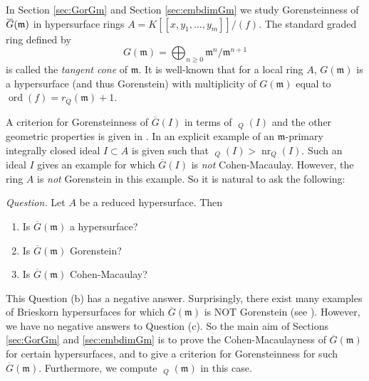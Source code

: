 \documentclass[12pt]{amsart}
\theoremstyle{definition}
\theoremstyle{remark}
\numberwithin{equation}{section}
\newcommand{\m}{{\mathfrak m}}
\DeclareMathOperator{\nr}{{nr}}
\DeclareMathOperator{\br}{\bar r}
\DeclareMathOperator{\ord}{ord}
\newcommand{\ol}[1]{\mkern 1.5mu\overline{\mkern-1.5mu#1\mkern-1.5mu}\mkern 1.5mu} %
\begin{document}
\par 
In Section \ref{sec:GorGm} and Section \ref{sec:embdimGm} 
we study Gorensteinness of $\ol{G}(\m)$ in hypersurface rings 
$A=K[\![x,y_1,\ldots,y_m]\!]/(f)$.
The standard graded ring defined by
\[
G(\m)=\bigoplus_{n \ge 0} \m^{n}/\m^{n+1}
\]
is called the \textit{tangent cone} of $\m$.
It is well-known that for a local ring $A$,
$G(\m)$ is a hypersurface (and thus Gorenstein) with 
multiplicity of $G(\m)$ equal to $\ord(f)=r_Q(\m)+1$.
\par 
A criterion for Gorensteinness of $\overline{G}(I)$ in terms of 
$\br_Q(I)$ and the other geometric properties is given 
in \cite{OWY6, OWY7}. 
In \cite[Example 2.8]{ORWY2022} an explicit example of 
an $\m$-primary integrally closed ideal $I \subset A$ 
is given such that $\br_Q(I) > \nr_Q(I)$. 
Such an ideal $I$ gives an example for which 
$\overline{G}(I)$ is \textit{not} Cohen-Macaulay. 
However, the ring $A$ is \textit{not} Gorenstein in this example. 
So it is natural to ask the following: 

\par \vspace{2mm} \par \noindent 
{\it Question.} 
Let $A$ be a reduced hypersurface. Then 
\begin{enumerate}
\item[\rm{(a)}] Is $\overline{G}(\m)$ a hypersurface?
\item[\rm{(b)}] Is $\overline{G}(\m)$ Gorenstein?
\item[\rm{(c)}] Is $\overline{G}(\m)$ Cohen-Macaulay?
\end{enumerate}

\par \vspace{2mm}
This Question (b)  has a negative answer. 
Surprisingly, there exist many examples of Brieskorn hypersurfaces 
for which $\overline{G}(\m)$ is NOT Gorenstein (see \cite{OWY6}). 
However, we have no negative answers to Question (c). 
So the main aim of Sections \ref{sec:GorGm} and 
\ref{sec:embdimGm} is to prove the Cohen-Macaulayness 
of $\overline{G}(\m)$ for certain hypersurfaces, 
and to give a criterion for Gorensteinness for such $\overline{G}(\m)$.  
Furthermore, we compute $\br_Q(\m)$ in this case. 
\end{document}
